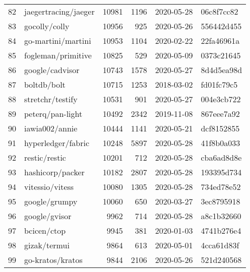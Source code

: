 \begin{longtable}{llrrll}
    82  &                               jaegertracing/jaeger &  10981 &   1196 & 2020-05-28 &  06c8f7cc82 \\
    83  &                                      gocolly/colly &  10956 &    925 & 2020-05-26 &  556442d455 \\
    84  &                                 go-martini/martini &  10953 &   1104 & 2020-02-22 &  22fa46961a \\
    85  &                                 fogleman/primitive &  10825 &    529 & 2020-05-09 &  0373c21645 \\
    86  &                                    google/cadvisor &  10743 &   1578 & 2020-05-27 &  8d4d5ea98d \\
    87  &                                        boltdb/bolt &  10715 &   1253 & 2018-03-02 &  fd01fc79c5 \\
    88  &                                   stretchr/testify &  10531 &    901 & 2020-05-27 &  004e3cb722 \\
    89  &                                   peterq/pan-light &  10492 &   2342 & 2019-11-08 &  867eee7a92 \\
    90  &                                     iawia002/annie &  10444 &   1141 & 2020-05-21 &  dcf8152855 \\
    91  &                                 hyperledger/fabric &  10248 &   5897 & 2020-05-28 &  41f8b0a033 \\
    92  &                                      restic/restic &  10201 &    712 & 2020-05-28 &  cba6ad8d8e \\
    93  &                                   hashicorp/packer &  10182 &   2807 & 2020-05-28 &  193395d734 \\
    94  &                                    vitessio/vitess &  10080 &   1305 & 2020-05-28 &  734ed78e52 \\
    95  &                                      google/grumpy &  10060 &    650 & 2020-03-27 &  3ec8795918 \\
    96  &                                      google/gvisor &   9962 &    714 & 2020-05-28 &  a8c1b32660 \\
    97  &                                        bcicen/ctop &   9945 &    381 & 2020-01-03 &  4741b276e4 \\
    98  &                                       gizak/termui &   9864 &    613 & 2020-05-01 &  4cca61d83f \\
    99  &                                   go-kratos/kratos &   9844 &   2106 & 2020-05-26 &  521d240568 \\

\end{longtable}
